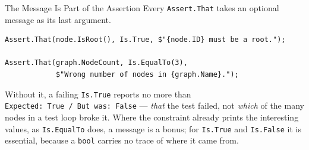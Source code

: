 \begin{frame}[fragile]{The Message Is Part of the Assertion}
  Every \texttt{Assert.That} takes an optional message as its last argument.
  \begin{lstlisting}[basicstyle=\scriptsize\ttfamily]
Assert.That(node.IsRoot(), Is.True, $"{node.ID} must be a root.");

Assert.That(graph.NodeCount, Is.EqualTo(3),
            $"Wrong number of nodes in {graph.Name}.");
  \end{lstlisting}
  \vspace{1ex}

  Without it, a failing \texttt{Is.True} reports no more than\\
  \texttt{Expected:~True / But was:~False} --- \emph{that} the test failed, not
  \emph{which} of the many nodes in a test loop broke it. Where the constraint
  already prints the interesting values, as \texttt{Is.EqualTo} does, a message
  is a bonus; for \texttt{Is.True} and \texttt{Is.False} it is essential,
  because a \texttt{bool} carries no trace of where it came from.
  \vspace{1ex}

\end{frame}


